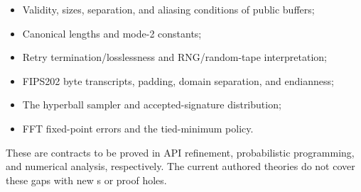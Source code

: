 \begin{itemize}
  \item Validity, sizes, separation, and aliasing conditions of public buffers;
  \item Canonical lengths and mode-2 constants;
  \item Retry termination/losslessness and RNG/random-tape interpretation;
  \item FIPS202 byte transcripts, padding, domain separation, and endianness;
  \item The hyperball sampler and accepted-signature distribution;
  \item FFT fixed-point errors and the tied-minimum policy.
\end{itemize}

These are contracts to be proved in API refinement, probabilistic programming,
and numerical analysis, respectively. The current authored theories do not cover
these gaps with new s or proof holes.
